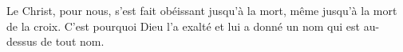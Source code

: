 Le Christ, pour nous, s’est fait obéissant jusqu’à la mort, même jusqu’à la mort de la croix.
\versseparator
C’est pourquoi Dieu l’a exalté et lui a donné un nom qui est au-dessus de tout nom.